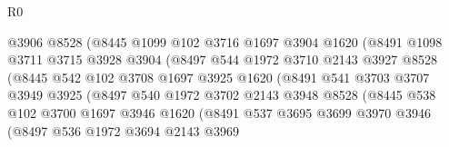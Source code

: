 \begin{lexlean}{R0}
\begin{coremodule}
                            @3906
                            @8528
                            (@8445
                              @1099
                              @102
                              @3716
                              @1697
                              @3904
                              @1620
                              (@8491
                                @1098
                                @3711
                                @3715
                                @3928
                                @3904
                                (@8497
                                  @544
                                  @1972
                                  @3710
                                  @2143
                                  @3927
                                  @8528
                                  (@8445
                                    @542
                                    @102
                                    @3708
                                    @1697
                                    @3925
                                    @1620
                                    (@8491
                                      @541
                                      @3703
                                      @3707
                                      @3949
                                      @3925
                                      (@8497
                                        @540
                                        @1972
                                        @3702
                                        @2143
                                        @3948
                                        @8528
                                        (@8445
                                          @538
                                          @102
                                          @3700
                                          @1697
                                          @3946
                                          @1620
                                          (@8491
                                            @537
                                            @3695
                                            @3699
                                            @3970
                                            @3946
                                            (@8497
                                              @536
                                              @1972
                                              @3694
                                              @2143
                                              @3969

\end{coremodule}
\end{lexlean}
